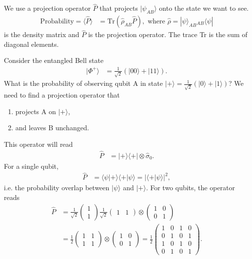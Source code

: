 \documentclass[a4paper, 11pt, normalem]{report}
\begin{document}
We use a projection operator $\hat{P}$ that projects $|\psi_{AB}\rangle$ onto the state we want to see.
\begin{align}
    \text{Probability} = \langle\hat{P}\rangle &= \text{Tr}(\hat{\rho}_{AB}\hat{P}), \text{ where } \hat{\rho} = |\psi\rangle_{AB} {}_{AB}\langle\psi|
\end{align}
is the density matrix and $\hat{P}$ is the projection operator.
The trace Tr is the sum of diagonal elements.
\begin{example}
    Consider the entangled Bell state
    \begin{align}
        |\Phi^+\rangle &= \frac{1}{\sqrt{2}}\left(|00\rangle+|11\rangle\right).
    \end{align}
    What is the probability of observing qubit A in state $|+\rangle=\frac{1}{\sqrt{2}}(|0\rangle+|1\rangle)$?
    We need to find a projection operator that
    \begin{enumerate}
        \item projects A on $|+\rangle$,
        \item and leaves B unchanged.
    \end{enumerate}
    This operator will read
    \begin{align}
        \hat{P} &= |+\rangle\langle+| \otimes \hat{\sigma}_0.
    \end{align}
    For a single qubit,
    \begin{align}
        \hat{P} &= \langle\psi|+\rangle\langle+|\psi\rangle = |\langle+|\psi\rangle|^2,
    \end{align}
    i.e. the probability overlap between $|\psi\rangle$ and $|+\rangle$.
    For two qubits, the operator reads
    \begin{align}
        \hat{P} &= \frac{1}{\sqrt{2}}\begin{pmatrix}1\\1\end{pmatrix}\frac{1}{\sqrt{2}}\begin{pmatrix} 1 & 1\end{pmatrix} \otimes \begin{pmatrix} 1 & 0 \\ 0 & 1\end{pmatrix} \\
                &= \frac12\begin{pmatrix} 1 & 1 \\ 1 & 1\end{pmatrix} \otimes \begin{pmatrix}1 & 0 \\ 0 & 1\end{pmatrix} = \frac12 \begin{pmatrix} 1 & 0 & 1 & 0 \\ 0 & 1 & 0 & 1 \\ 1 & 0 & 1 & 0 \\ 0 & 1 & 0 & 1\end{pmatrix}.

\end{align}
\end{example}
\end{document}
